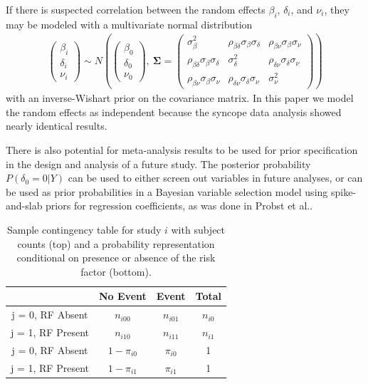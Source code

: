 \documentclass[AMA,STIX1COL]{WileyNJD-v2}
\begin{document}
If there is suspected correlation between the random effects $\beta_i$, $\delta_i$, and $\nu_i$, they may be modeled with a multivariate normal distribution
\begin{align}
\begin{pmatrix}
\beta_i \\
\delta_i \\
\nu_i
\end{pmatrix}\sim N\left(\begin{pmatrix}
\beta_0 \\
\delta_0 \\
\nu_0
\end{pmatrix}, \: \boldsymbol{\Sigma} = \begin{pmatrix}
\sigma^2_{\beta} & \rho_{\beta \delta} \sigma_{\beta} \sigma_{\delta}&  \rho_{\beta \nu} \sigma_{\beta} \sigma_{\nu}\\
\rho_{\beta \delta} \sigma_{\beta} \sigma_{\delta} & \sigma^2_{\delta} & \rho_{\delta \nu} \sigma_{\delta} \sigma_{\nu} \\
\rho_{\beta \nu} \sigma_{\beta} \sigma_{\nu} & \rho_{\delta \nu}\sigma_{\delta} \sigma_{\nu} & \sigma^2_{\nu}
\end{pmatrix}\right) \label{eq:mvn_random_effects}
\end{align}
with an inverse-Wishart prior on the covariance matrix. In this paper we model the random effects as independent because the syncope data analysis showed nearly identical results.


There is also potential for meta-analysis results to be used for prior specification in the design and analysis of a future study. The posterior probability $P(\delta_0 = 0 \vert Y)$ can be used to either screen out variables in future analyses, or can be used as prior probabilities in a Bayesian variable selection model using spike-and-slab priors for regression coefficients, as was done in Probst et al.\cite{probst2020faint}.



\clearpage 


\begin{table}[!ht]
\centering
\begin{tabular}{c|cc|c}
                           & No Event          & Event       & Total        \\ \hline
j = 0, RF Absent  & $n_{i00} $ & $n_{i01}$    & $n_{i0}$     \\
j = 1, RF Present & $n_{i10}$ & $n_{i11}$    & $n_{i1}$     \\ \hline
j = 0, RF Absent & $1 - \pi_{i0}$    & $\pi_{i0}$  & 1            \\
j = 1, RF Present & $1 - \pi_{i1}$    & $\pi_{i1}$  & 1            \\ \hline 
\end{tabular}
\caption{Sample contingency table for study $i$ with subject counts (top) and a probability representation conditional on presence or absence of the risk factor (bottom).}
\label{table:RCT_contingency}
\end{table}
\end{document}
